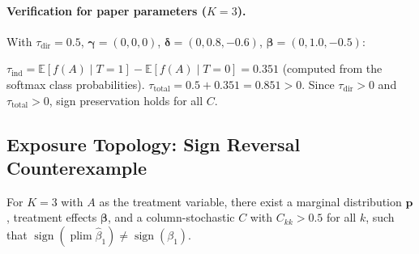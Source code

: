 \paragraph{Verification for paper parameters ($K{=}3$).}
With $\tau_{\mathrm{dir}}{=}0.5$, $\boldsymbol{\gamma}{=}(0,0,0)$, $\boldsymbol{\delta}{=}(0,0.8,{-}0.6)$, $\boldsymbol{\beta}{=}(0,1.0,{-}0.5)$:

$\tau_{\mathrm{ind}}=\mathbb{E}[f(A)\mid T{=}1]-\mathbb{E}[f(A)\mid T{=}0]=0.351$ (computed from the softmax class probabilities).
$\tau_{\mathrm{total}}=0.5+0.351=0.851>0$.
Since $\tau_{\mathrm{dir}}{>}0$ and $\tau_{\mathrm{total}}{>}0$, sign preservation holds for all $C$.

\subsection{Exposure Topology: Sign Reversal Counterexample}
\label{app:exposure}

\begin{proposition}
\label{prop:exp_counter}
For $K{=}3$ with $A$ as the treatment variable, there exist a marginal distribution $\mathbf{p}$, treatment effects $\boldsymbol{\beta}$, and a column-stochastic $C$ with $C_{kk}>0.5$ for all $k$, such that $\operatorname{sign}(\operatorname{plim}\hat\beta_1)\neq\operatorname{sign}(\beta_1)$.
\end{proposition}

